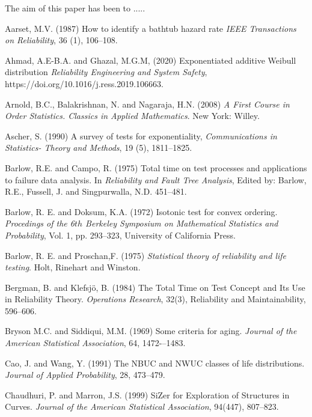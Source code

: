 \documentclass[preprint,12pt]{elsarticle}
\begin{document}
The aim of this paper has been to .....
\newpage
\begin{thebibliography}{}

 Aarset, M.V. (1987) How to identify a bathtub hazard rate {\it IEEE Transactions on Reliability}, 36 (1), 106--108.

 Ahmad, A.E-B.A. and Ghazal, M.G.M, (2020) Exponentiated additive Weibull distribution {\it Reliability Engineering and System Safety}, https://doi.org/10.1016/j.ress.2019.106663.

 Arnold, B.C., Balakrishnan, N. and Nagaraja, H.N. (2008) \textit{A First Course in Order Statistics. Classics in Applied Mathematics}. New York: Willey. 

 Ascher, S. (1990) A survey of tests for exponentiality, {\it Communications in Statistics- Theory and Methods}, 19 (5), 1811--1825.

 Barlow, R.E. and Campo, R. (1975) Total time on test processes and applications to failure data analysis. In \textit{Reliability and Fault Tree Analysis}, Edited by: Barlow, R.E., Fussell, J. and Singpurwalla, N.D. 451–481.

 Barlow, R. E. and Doksum, K.A. (1972) Isotonic test for convex ordering. \textit{Procedings of the 6$th$ Berkeley Symposium on Mathematical Statistics and Probability}, Vol. 1, pp. 293--323, University of California Press.

 Barlow, R. E. and Proschan,F. (1975) \textit{Statistical theory of reliability and life testing}. Holt, Rinehart and Winston.

 Bergman, B. and Klefsjö, B. (1984) The Total Time on Test Concept and Its Use in Reliability Theory. \textit{Operations Research}, 32(3), Reliability and Maintainability,  596--606.


  Bryson M.C. and Siddiqui, M.M. (1969) Some criteria for aging. \textit{Journal of the American Statistical Association},  64, 1472-–1483. 

 Cao, J. and Wang, Y. (1991) The NBUC and NWUC classes of life distributions. \textit{Journal of Applied Probability}, 28, 473--479.

 Chaudhuri, P. and Marron, J.S. (1999)  SiZer for Exploration of Structures in Curves. \textit{Journal of the American Statistical Association}, 94(447),  807--823.


\end{thebibliography}
\end{document}
